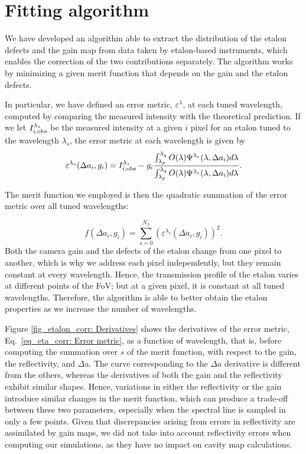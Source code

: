 \section{\label{eta_corr_susec: fitting algorithm}Fitting algorithm}

We have developed an algorithm able to extract the distribution of the etalon defects and the gain map from data taken by etalon-based instruments, which enables the correction of the two contributions separately. The algorithm works by minimizing a given merit function that depends on the gain and the etalon defects. 

In particular, we have defined an error metric, $\varepsilon  ^\lambda$, at each tuned wavelength, computed by comparing the measured intensity with the theoretical prediction. If we let $I_ {i, {\rm obs}} ^{\lambda _s}$ be the measured intensity at a given $i$ pixel for an etalon tuned to the wavelength $\lambda_s$, the error metric at each wavelength is given by
\begin{equation}
\varepsilon ^{\lambda _s} (\Delta a _i, g _ i) =  I _ {i, {\rm obs}} ^{\lambda _ s} - g_i \frac{\int_{\lambda_p}^{\lambda_q} O(\lambda)\Psi^{\lambda _ s} (\lambda, \Delta a _ i)  d\lambda}{\int_{\lambda_p}^{\lambda_q} O(\lambda)\Psi^{\lambda _ c} (\lambda, \Delta a _ i)  d\lambda}
\label{eq_eta_corr: Error metric}.
\end{equation}

The merit function we employed is then the quadratic summation of the error metric over all tuned wavelengths:

\begin{equation}
f(\Delta a _i, g _ i) = \sum _ {s = 0} ^ {N_\lambda} \left( \varepsilon ^{\lambda _s} (\Delta a _i, g _ i) \right) ^ 2.  
\label{eq_eta_corr: Merit Function}
\end{equation}
Both the camera gain and the defects of the etalon change from one pixel to another, which is why we address each pixel independently, but they remain constant at every wavelength. Hence, the transmission profile of the etalon varies at different points of the FoV; but at a given pixel, it is constant at all tuned wavelengths. Therefore, the algorithm is able to better obtain the etalon properties as we increase the number of wavelengths.

Figure \ref{fig_etalon_corr: Derivatives} shows the derivatives of the error metric, Eq.~\eqref{eq_eta_corr: Error metric}, as a function of wavelength, that is, before computing the summation over $s$ of the merit function, with respect to the gain, the reflectivity, and $\Delta $a. The curve corresponding to the $\Delta a$ derivative is different from the others, whereas the derivatives of both the gain and the reflectivity exhibit similar shapes. Hence, variations in either the reflectivity or the gain introduce similar changes in the merit function, which can produce a trade-off between these two parameters, especially when the spectral line is sampled in only a few points. Given that discrepancies arising from errors in reflectivity are assimilated by gain maps, we did not take into account reflectivity errors when computing our simulations, as they have no impact on cavity map calculations.

